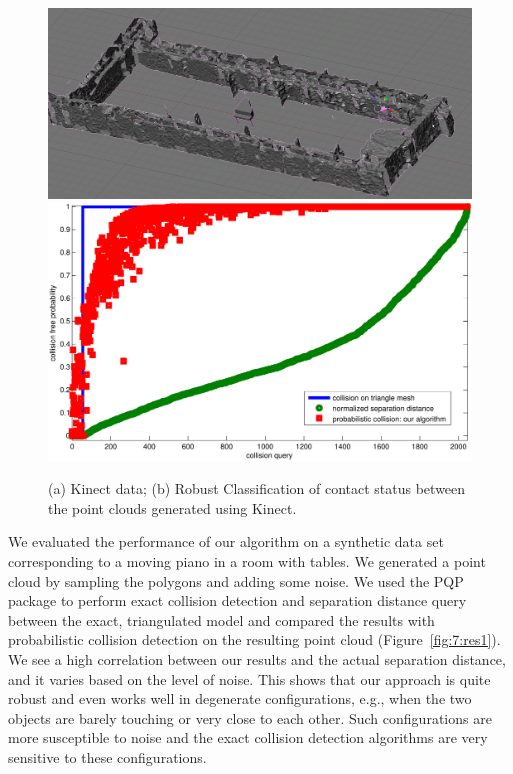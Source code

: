 \begin{figure}[!htb]
  \centering
  \includegraphics[width=0.79\linewidth]{figs/7/kinect.png}
  \includegraphics[width=0.79\linewidth]{figs/7/kinect.pdf}
  \caption[Comparison between the results for $100$ random queries between prior collision detection algorithms for exact triangle meshes and our
  algorithm on the Kinect data]{\label{fig:7:res3} (a) Kinect data; (b) Robust Classification of contact status between the point clouds generated using Kinect.}
\end{figure}



We evaluated the performance of our algorithm on a synthetic data set corresponding to a moving piano in a room with tables.
We generated a point cloud by sampling the polygons and adding some noise. We used the PQP package to perform exact collision detection and separation
distance query between the exact, triangulated model and compared the results with probabilistic collision detection on the resulting point cloud (Figure~\ref{fig:7:res1}). We see a high correlation between our results and the actual separation distance, and it varies based on the level of noise.
This shows that our approach is quite robust and even works well in degenerate configurations, e.g., when the two objects are barely touching or very close to each other. Such configurations are more susceptible to noise and the exact collision detection algorithms are very sensitive to these configurations.



